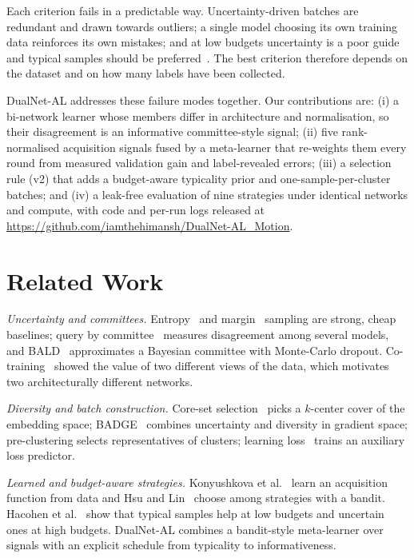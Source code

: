 \documentclass[conference,a4paper]{IEEEtran}
\begin{document}
Each criterion fails in a predictable way. Uncertainty-driven batches are redundant and drawn towards outliers; a
single model choosing its own training data reinforces its own mistakes; and at low budgets uncertainty is a poor
guide and typical samples should be preferred~\cite{hacohen2022}. The best criterion therefore depends on the
dataset and on how many labels have been collected.

DualNet-AL addresses these failure modes together. Our contributions are: (i) a bi-network learner whose members
differ in architecture and normalisation, so their disagreement is an informative committee-style signal; (ii) five
rank-normalised acquisition signals fused by a meta-learner that re-weights them every round from measured
validation gain and label-revealed errors; (iii) a selection rule (v2) that adds a budget-aware typicality prior and
one-sample-per-cluster batches; and (iv) a leak-free evaluation of nine strategies under identical networks and
compute, with code and per-run logs released at \url{https://github.com/iamthehimansh/DualNet-AL_Motion}.

\section{Related Work}
\textit{Uncertainty and committees.} Entropy~\cite{lewis1994} and margin~\cite{scheffer2001} sampling are strong,
cheap baselines; query by committee~\cite{seung1992} measures disagreement among several models, and
BALD~\cite{houlsby2011,gal2017} approximates a Bayesian committee with Monte-Carlo dropout. Co-training~\cite{blum1998}
showed the value of two different views of the data, which motivates two architecturally different networks.

\textit{Diversity and batch construction.} Core-set selection~\cite{sener2018} picks a $k$-center cover of the
embedding space; BADGE~\cite{ash2020} combines uncertainty and diversity in gradient space; pre-clustering
\cite{nguyen2004} selects representatives of clusters; learning loss~\cite{yoo2019} trains an auxiliary loss predictor.

\textit{Learned and budget-aware strategies.} Konyushkova et al.~\cite{konyushkova2017} learn an acquisition function
from data and Hsu and Lin~\cite{hsu2015} choose among strategies with a bandit. Hacohen et al.~\cite{hacohen2022} show
that typical samples help at low budgets and uncertain ones at high budgets. DualNet-AL combines a bandit-style
meta-learner over signals with an explicit schedule from typicality to informativeness.
\end{document}
